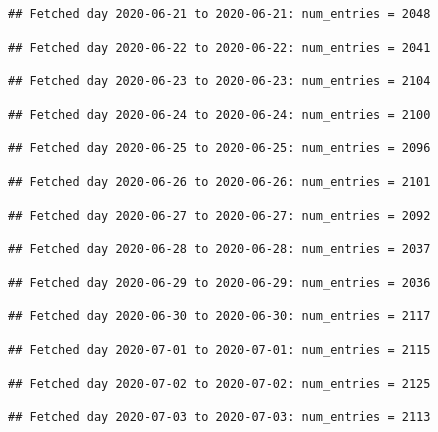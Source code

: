 \documentclass[]{article}
\begin{document}
\begin{verbatim}
## Fetched day 2020-06-21 to 2020-06-21: num_entries = 2048
\end{verbatim}

\begin{verbatim}
## Fetched day 2020-06-22 to 2020-06-22: num_entries = 2041
\end{verbatim}

\begin{verbatim}
## Fetched day 2020-06-23 to 2020-06-23: num_entries = 2104
\end{verbatim}

\begin{verbatim}
## Fetched day 2020-06-24 to 2020-06-24: num_entries = 2100
\end{verbatim}

\begin{verbatim}
## Fetched day 2020-06-25 to 2020-06-25: num_entries = 2096
\end{verbatim}

\begin{verbatim}
## Fetched day 2020-06-26 to 2020-06-26: num_entries = 2101
\end{verbatim}

\begin{verbatim}
## Fetched day 2020-06-27 to 2020-06-27: num_entries = 2092
\end{verbatim}

\begin{verbatim}
## Fetched day 2020-06-28 to 2020-06-28: num_entries = 2037
\end{verbatim}

\begin{verbatim}
## Fetched day 2020-06-29 to 2020-06-29: num_entries = 2036
\end{verbatim}

\begin{verbatim}
## Fetched day 2020-06-30 to 2020-06-30: num_entries = 2117
\end{verbatim}

\begin{verbatim}
## Fetched day 2020-07-01 to 2020-07-01: num_entries = 2115
\end{verbatim}

\begin{verbatim}
## Fetched day 2020-07-02 to 2020-07-02: num_entries = 2125
\end{verbatim}

\begin{verbatim}
## Fetched day 2020-07-03 to 2020-07-03: num_entries = 2113
\end{verbatim}
\end{document}
